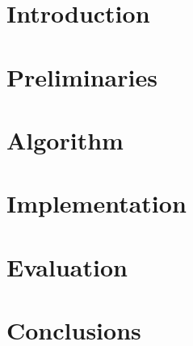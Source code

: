






\chapter{Introduction}
\label{chap:intro}


\chapter{Preliminaries}
\label{chap:preliminaries}


\chapter{Algorithm}
\label{chap:algorithm}


\chapter{Implementation}
\label{chap:implementation}


\chapter{Evaluation}
\label{chap:evaluation}


\chapter{Conclusions}
\label{chap:conclusions}

\printbibliography[heading=bibintoc] %



